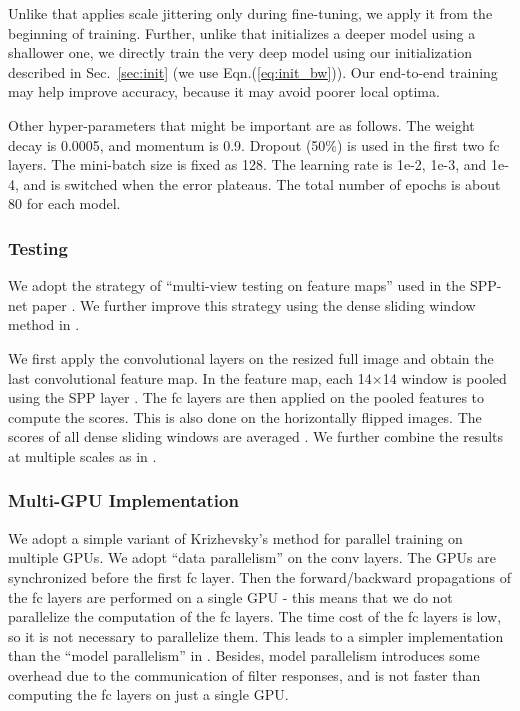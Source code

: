 \documentclass[10pt,twocolumn,letterpaper]{article}
\begin{document}
Unlike \cite{Simonyan2014} that applies scale jittering only during fine-tuning, we apply it from the beginning of training. Further, unlike \cite{Simonyan2014} that initializes a deeper model using a shallower one, we directly train the very deep model using our initialization described in Sec.~\ref{sec:init} (we use Eqn.(\ref{eq:init_bw})). Our end-to-end training may help improve accuracy, because it may avoid poorer local optima.

Other hyper-parameters that might be important are as follows. The weight decay is 0.0005, and momentum is 0.9. Dropout (50\%) is used in the first two fc layers. The mini-batch size is fixed as 128.
The learning rate is 1e-2, 1e-3, and 1e-4, and is switched when the error plateaus.
The total number of epochs is about 80 for each model.

\subsubsection*{Testing}

We adopt the strategy of ``multi-view testing on feature maps'' used in the SPP-net paper \cite{He2014}. We further improve this strategy using the dense sliding window method in \cite{Sermanet2014,Simonyan2014}.

We first apply the convolutional layers on the resized full image and obtain the last convolutional feature map. In the feature map, each 14$\times$14 window is pooled using the SPP layer \cite{He2014}. The fc layers are then applied on the pooled features to compute the scores. This is also done on the horizontally flipped images. The scores of all dense sliding windows are averaged \cite{Sermanet2014,Simonyan2014}.
We further combine the results at multiple scales as in \cite{He2014}.


\subsubsection*{Multi-GPU Implementation}

We adopt a simple variant of Krizhevsky's method \cite{Krizhevsky2014} for parallel training on multiple GPUs.
We adopt ``data parallelism'' \cite{Krizhevsky2014} on the conv layers. The GPUs are synchronized before the first fc layer. Then the forward/backward propagations of the fc layers are performed on a single GPU - this means that we do not parallelize the computation of the fc layers. The time cost of the fc layers is low, so it is not necessary to parallelize them. This leads to a simpler implementation than the ``model parallelism'' in \cite{Krizhevsky2014}.
Besides, model parallelism introduces some overhead due to the communication of filter responses, and is not faster than computing the fc layers on just a single GPU.
\end{document}
